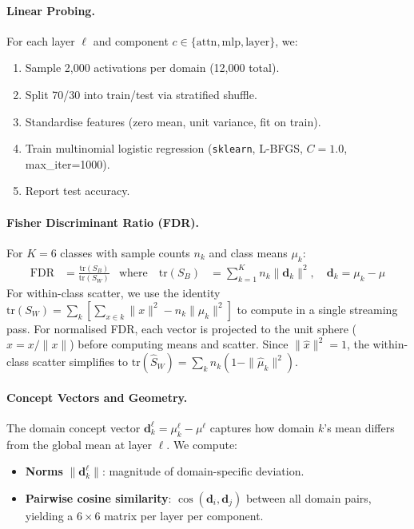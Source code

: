 \documentclass[11pt]{article}
\begin{document}
\paragraph{Linear Probing.}
For each layer $\ell$ and component $c \in \{\text{attn}, \text{mlp}, \text{layer}\}$, we:
\begin{enumerate}
    \item Sample 2{,}000 activations per domain (12{,}000 total).
    \item Split 70/30 into train/test via stratified shuffle.
    \item Standardise features (zero mean, unit variance, fit on train).
    \item Train multinomial logistic regression (\texttt{sklearn}, L-BFGS, $C=1.0$, max\_iter=1000).
    \item Report test accuracy.
\end{enumerate}

\paragraph{Fisher Discriminant Ratio (FDR).}
For $K = 6$ classes with sample counts $n_k$ and class means $\mu_k$:
\begin{align}
    \text{FDR} &= \frac{\text{tr}(S_B)}{\text{tr}(S_W)}
    &\text{where}\quad
    \text{tr}(S_B) &= \sum_{k=1}^K n_k \|\mathbf{d}_k\|^2, \quad
    \mathbf{d}_k = \mu_k - \mu
\end{align}
For within-class scatter, we use the identity $\text{tr}(S_W) = \sum_k \left[\sum_{x \in k} \|x\|^2 - n_k \|\mu_k\|^2\right]$ to compute in a single streaming pass. For normalised FDR, each vector is projected to the unit sphere ($\hat{x} = x / \|x\|$) before computing means and scatter. Since $\|\hat{x}\|^2 = 1$, the within-class scatter simplifies to $\text{tr}(\hat{S}_W) = \sum_k n_k(1 - \|\hat{\mu}_k\|^2)$.

\paragraph{Concept Vectors and Geometry.}
The domain concept vector $\mathbf{d}_k^\ell = \mu_k^\ell - \mu^\ell$ captures how domain $k$'s mean differs from the global mean at layer $\ell$. We compute:
\begin{itemize}
    \item \textbf{Norms} $\|\mathbf{d}_k^\ell\|$: magnitude of domain-specific deviation.
    \item \textbf{Pairwise cosine similarity}: $\cos(\mathbf{d}_i, \mathbf{d}_j)$ between all domain pairs, yielding a $6 \times 6$ matrix per layer per component.
\end{itemize}
\end{document}

